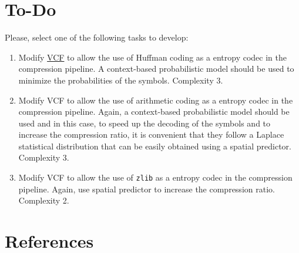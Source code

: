\section{To-Do}
Please, select one of the following tasks to develop:
\begin{enumerate}
\item Modify \href{https://github.com/Sistemas-Multimedia/VCF}{VCF} to
  allow the use of Huffman coding as a entropy codec in the
  compression pipeline. A context-based probabilistic model should be
  used to minimize the probabilities of the symbols. Complexity 3.
\item Modify VCF to allow the use of arithmetic coding as a entropy
  codec in the compression pipeline. Again, a context-based
  probabilistic model should be used and in this case, to speed up the
  decoding of the symbols and to increase the compression ratio, it is
  convenient that they follow a Laplace statistical distribution that
  can be easily obtained using a spatial predictor. Complexity 3.
\item Modify VCF to allow the use of \texttt{zlib} as a entropy codec
  in the compression pipeline. Again, use spatial predictor to
  increase the compression ratio. Complexity 2.
\end{enumerate}

\section{References}

\renewcommand{\addcontentsline}[3]{}%

